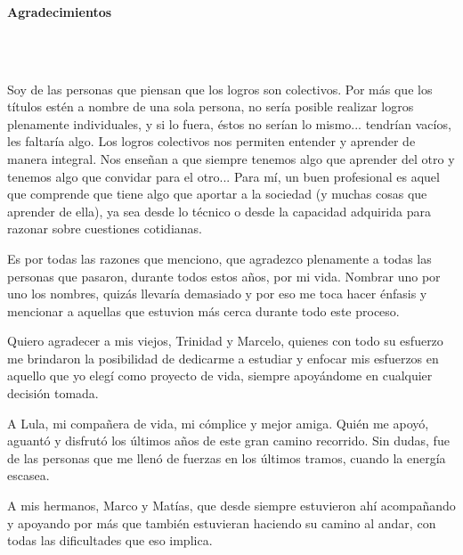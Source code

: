 \newpage{\pagestyle{empty}\cleardoublepage}

\newpage
\thispagestyle{empty} \textbf{}\normalsize
\\\\\\%
\textbf{\LARGE Agradecimientos}
\\\\
\justifying

  \par Soy de las personas que piensan que los logros son colectivos. Por más que
    los títulos estén a nombre de una sola persona, no sería posible realizar logros
    plenamente individuales, y si lo fuera, éstos no serían lo mismo... tendrían
    vacíos, les faltaría algo. Los logros colectivos nos permiten entender y aprender
    de manera integral. Nos enseñan a que siempre tenemos algo que aprender del otro
    y tenemos algo que convidar para el otro... Para mí, un buen profesional es
    aquel que comprende que tiene algo que aportar a la sociedad
    (y muchas cosas que aprender de ella),
    ya sea desde lo técnico o desde la capacidad adquirida para razonar sobre
    cuestiones cotidianas.

  \par Es por todas las razones que menciono, que agradezco plenamente a todas las
    personas que pasaron, durante todos estos años, por mi vida. Nombrar uno
    por uno los nombres, quizás llevaría demasiado y por eso me toca hacer
    énfasis y mencionar a aquellas que estuvion más cerca durante todo
    este proceso.

  \par Quiero agradecer a mis viejos, Trinidad y Marcelo, quienes con todo su esfuerzo
    me brindaron la posibilidad de dedicarme a estudiar y enfocar mis esfuerzos en
    aquello que yo elegí como proyecto de vida, siempre apoyándome en cualquier
    decisión tomada.

  \par A Lula, mi compañera de vida, mi cómplice y mejor amiga. Quién me apoyó,
    aguantó y disfrutó los últimos años de este gran camino recorrido. Sin
    dudas, fue de las personas que me llenó de fuerzas en los últimos tramos, cuando
    la energía escasea.

  \par A mis hermanos, Marco y Matías, que desde siempre estuvieron ahí
    acompañando y apoyando por más que también estuvieran haciendo su
    camino al andar, con todas las dificultades que eso implica.

